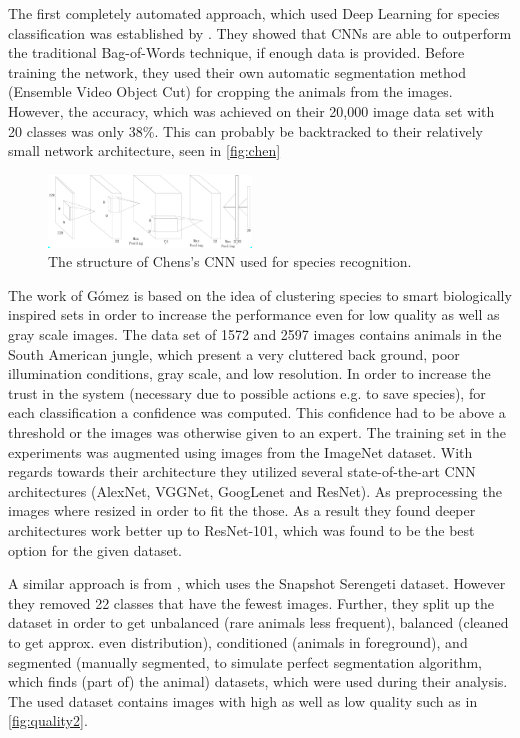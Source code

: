 \documentclass[electronic]{vgtc}             %
\begin{document}
	The first completely automated approach, which used Deep Learning for species classification was established by \cite{Chen:2014}. 
	They showed that CNNs are able to outperform the traditional Bag-of-Words technique, if enough data is provided. 
	Before training the network, they used their own automatic segmentation method (Ensemble Video Object Cut) for cropping the animals from the images.
	However, the accuracy, which was achieved on their 20,000 image data set with 20 classes was only 38\%. 
	This can probably be backtracked to their relatively small network architecture, seen in \autoref{fig:chen}
	
	\begin{figure}[htbp]
		\includegraphics[width=0.48\textwidth]{Chen}
		\caption{The structure of Chens's CNN used for species recognition.\cite{Chen:2014}}
		\label{fig:chen}
	\end{figure}
	
	The work of G\'omez \cite{Gomez:2016:Low} is based on the idea of clustering species to smart biologically inspired sets in order to increase the performance even for low quality as well as gray scale images.
	The data set of 1572 and 2597 images contains animals in the South American jungle, which present a very cluttered back	ground, poor illumination conditions, gray scale, and low resolution.
	In order to increase the trust in the system (necessary due to possible actions e.g. to save species), for each classification a confidence was computed.
	This confidence had to be above a threshold or the images was otherwise given to an expert.
	The	training set in the experiments was augmented using images from the ImageNet
	dataset.
	With regards towards their architecture they utilized several state-of-the-art CNN architectures (AlexNet, VGGNet, GoogLenet and ResNet).
	As preprocessing the images where resized in order to fit the those.
	As a result they found deeper architectures work better up to ResNet-101, which was found to be the best option for the given dataset. 
	
	A similar approach is from \cite{Gomez:2016}, which uses the Snapshot Serengeti dataset. 
	However they removed 22 classes	that have the fewest images.
	Further, they split up the dataset in order to get unbalanced (rare animals less frequent), balanced (cleaned to get approx. even distribution), conditioned (animals in foreground), and segmented (manually segmented, to simulate perfect segmentation algorithm, which finds (part of) the animal) datasets, which were used during their analysis.
	The used dataset contains images with high as well as low quality such as in \autoref{fig:quality2}. 
		
\end{document}
